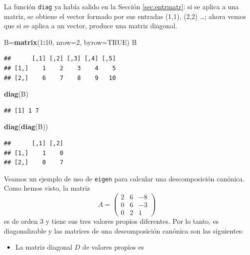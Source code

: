 \documentclass[]{book}
\newenvironment{Shaded}{\begin{snugshade}}{\end{snugshade}}
\newcommand{\DataTypeTok}[1]{\textcolor[rgb]{0.13,0.29,0.53}{#1}}
\newcommand{\DecValTok}[1]{\textcolor[rgb]{0.00,0.00,0.81}{#1}}
\newcommand{\KeywordTok}[1]{\textcolor[rgb]{0.13,0.29,0.53}{\textbf{#1}}}
\newcommand{\NormalTok}[1]{#1}
\newcommand{\OperatorTok}[1]{\textcolor[rgb]{0.81,0.36,0.00}{\textbf{#1}}}
\newcommand{\OtherTok}[1]{\textcolor[rgb]{0.56,0.35,0.01}{#1}}
\providecommand{\tightlist}{%
  \setlength{\itemsep}{0pt}\setlength{\parskip}{0pt}}
\theoremstyle{definition}
\theoremstyle{definition}
\theoremstyle{definition}
\theoremstyle{remark}
\begin{document}
La función \texttt{diag} ya había salido en la Sección \ref{sec:entrmatr}: si se aplica a una matriz, se obtiene el vector formado por sus entradas (1,1), (2,2) \ldots{}; ahora vemos que si se aplica a un vector, produce una matriz diagonal.

\begin{Shaded}
\begin{Highlighting}[]
\NormalTok{B=}\KeywordTok{matrix}\NormalTok{(}\DecValTok{1}\OperatorTok{:}\DecValTok{10}\NormalTok{, }\DataTypeTok{nrow=}\DecValTok{2}\NormalTok{, }\DataTypeTok{byrow=}\OtherTok{TRUE}\NormalTok{)}
\NormalTok{B}
\end{Highlighting}
\end{Shaded}

\begin{verbatim}
##      [,1] [,2] [,3] [,4] [,5]
## [1,]    1    2    3    4    5
## [2,]    6    7    8    9   10
\end{verbatim}

\begin{Shaded}
\begin{Highlighting}[]
\KeywordTok{diag}\NormalTok{(B)}
\end{Highlighting}
\end{Shaded}

\begin{verbatim}
## [1] 1 7
\end{verbatim}

\begin{Shaded}
\begin{Highlighting}[]
\KeywordTok{diag}\NormalTok{(}\KeywordTok{diag}\NormalTok{(B))}
\end{Highlighting}
\end{Shaded}

\begin{verbatim}
##      [,1] [,2]
## [1,]    1    0
## [2,]    0    7
\end{verbatim}

Veamos un ejemplo de uso de \texttt{eigen} para calcular una descomposición canónica.
Como hemos visto, la matriz
\[
A=\left(\begin{array}{ccc}2 & 6 & -8 \\ 0 & 6 & -3 \\ 0 & 2 & 1\end{array}
\right)
\]
es de orden 3 y tiene sus tres valores propios diferentes. Por lo tanto, es diagonalizable y las matrices de una descomposición canónica son las siguientes:

\begin{itemize}
\tightlist
\item
  La matriz diagonal \(D\) de valores propios es
\end{itemize}
\end{document}
